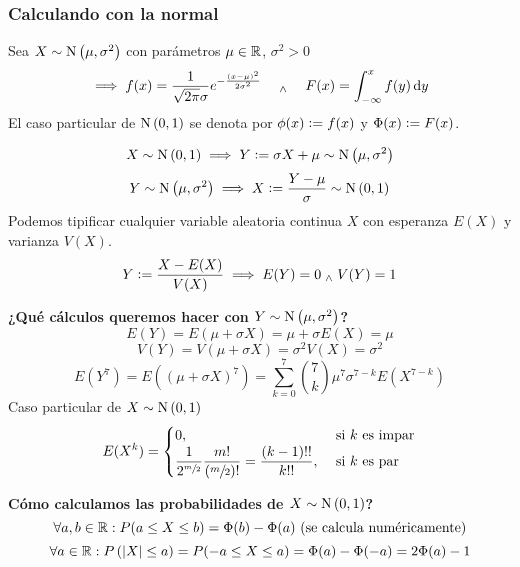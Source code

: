 \subsubsection{Calculando con la normal }
Sea $X\sim\operatorname{N}\left(\mu, \sigma^2\right)$ con parámetros $\mu\in\mathbb{R}$, $\sigma^2>0$\
\[\implies f(x) = \frac{1}{\sqrt{2\pi}\sigma} e^{-\frac{(x-\mu)^2}{2\sigma^2}} \quad \we \quad F(x) = \int_{-\infty}^{x} f(y) \odif{y}\]
El caso particular de $\operatorname{N}\left(0, 1\right)$ se denota por $\phi(x) \vcentcolon= f(x)$ y $\Phi(x)\vcentcolon= F(x)$.
\begin{center}
\end{center}

\[X\sim\operatorname{N}\left(0, 1\right) \implies Y\vcentcolon=\sigma X + \mu \sim \operatorname{N}\left(\mu, \sigma^2\right)\]
\[Y\sim\operatorname{N}\left(\mu, \sigma^2\right) \implies X\vcentcolon= \frac{Y-\mu}{\sigma} \sim \operatorname{N}\left(0, 1\right)\]
Podemos tipificar cualquier variable aleatoria continua $X$ con esperanza $E(X)$ y varianza $V(X)$.
\[Y\vcentcolon= \frac{X-E(X)}{V(X)} \implies E(Y) = 0 \; _{\wedge} \; V(Y) = 1\]

\textbf{¿Qué cálculos queremos hacer con $Y\sim\operatorname{N}\left(\mu, \sigma^2\right)$?}
\[E(Y) = E(\mu + \sigma X) = \mu + \sigma E(X) = \mu\]
\[V(Y) = V(\mu + \sigma X) = \sigma^2 V(X) = \sigma^2\]
\[E(Y^7) = E\left(\left(\mu + \sigma X\right)^7\right) = \sum_{k=0}^7 \binom{7}{k} \mu^7 \sigma^{7-k} E(X^{7-k})\]
Caso particular de $X\sim \operatorname{N}\left(0,1\right)$ %
\[E(X^k) = \begin{cases}
		0,                                                                                          & \text{ si } k \text{ es impar} \\
		\displaystyle \frac{1}{2^{\sfrac{m}{2}}} \frac{m!}{\left(\sfrac{m}{2}\right)!} = \frac{(k-1)!!}{k!!}, & \text{ si } k \text{ es par}
	\end{cases}\]

\textbf{Cómo calculamos las probabilidades de $X\sim\operatorname{N}\left(0,1\right)$?}
\[\forall a, b \in \mathbb{R} : P(a\leq X \leq b) = \Phi(b) - \Phi(a) \text{ (se calcula numéricamente)}\]
\[\forall a \in \mathbb{R} : P\left(\left|X\right| \leq a\right) = P(-a \leq X\leq a) = \Phi(a) - \Phi(-a) = 2\Phi(a) - 1\]

